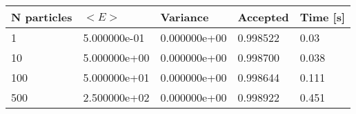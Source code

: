 \begin{table}[h!]
\centering 
\begin{tabular}{|l|l|l|l|l|}
\hline 
N particles & $<E>$ & Variance & Accepted & Time [s]\\ 
 \hline 
1 & 5.000000e-01 & 0.000000e+00 & 0.998522 & 0.03 \\ \hline 
10 & 5.000000e+00 & 0.000000e+00 & 0.998700 & 0.038 \\ \hline 
100 & 5.000000e+01 & 0.000000e+00 & 0.998644 & 0.111 \\ \hline 
500 & 2.500000e+02 & 0.000000e+00 & 0.998922 & 0.451 \\ \hline 
\end{tabular}
\label{tab:ia1} 
\end{table} 
